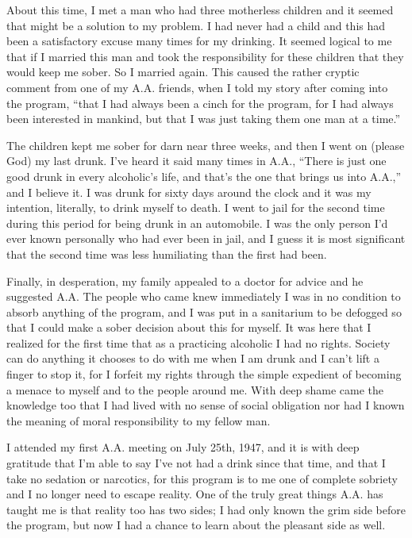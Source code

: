 \begin{biblechapter}
About this time, I met a man who had three motherless children and it seemed that might be a solution to my problem. I had never had a child and this had been a satisfactory excuse many times for my drinking. It seemed logical to me that if I married this man and took the responsibility for these children that they would keep me sober. So I married again. This caused the rather cryptic comment from one of my A.A. friends, when I told my story after coming into the program, “that I had always been a cinch for the program, for I had always been interested in mankind, but that I was just taking them one man at a time.”

The children kept me sober for darn near three weeks, and then I went on (please God) my last drunk. I’ve heard it said many times in A.A., “There is just one good drunk in every alcoholic’s life, and that’s the one that brings us into A.A.,” and I believe it. I was drunk for sixty days around the clock and it was my intention, literally, to drink myself to death. I went to jail for the second time during this period for being drunk in an automobile. I was the only person I’d ever known personally who had ever been in jail, and I guess it is most significant that the second time was less humiliating than the first had been.

Finally, in desperation, my family appealed to a doctor for advice and he suggested A.A. The people who came knew immediately I was in no condition to absorb anything of the program, and I was put in a sanitarium to be defogged so that I could make a sober decision about this for myself. It was here that I realized for the first time that as a practicing alcoholic I had no rights. Society can do anything it chooses to do with me when I am drunk and I can’t lift a finger to stop it, for I forfeit my rights through the simple expedient of becoming a menace to myself and to the people around me. With deep shame came the knowledge too that I had lived with no sense of social obligation nor had I known the meaning of moral responsibility to my fellow man.

I attended my first A.A. meeting on July 25th, 1947, and it is with deep gratitude that I’m able to say I’ve not had a drink since that time, and that I take no sedation or narcotics, for this program is to me one of complete sobriety and I no longer need to escape reality. One of the truly great things A.A. has taught me is that reality too has two sides; I had only known the grim side before the program, but now I had a chance to learn about the pleasant side as well.


\end{biblechapter}
